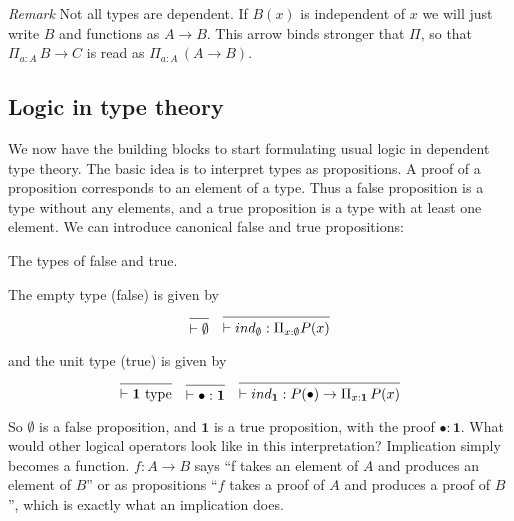 \documentclass[a4paper, 12pt]{article}
\newcommand{\type}{\text{ type}}
\theoremstyle{changedot}
\theoremstyle{changedotbreak}
\theoremstyle{nonumberplain}
\begin{document}
\textit{Remark} Not all types are dependent. If $B(x)$ is independent of $x$ we will just write $B$ and functions as $A \to B$. This arrow binds stronger that $\Pi$, so that $\Pi_{a:A}\, B \to C$ is read as $\Pi_{a:A}\, (A \to B)$.

\subsection{Logic in type theory}
We now have the building blocks to start formulating usual logic in dependent type theory. The basic idea is to interpret types as propositions. A proof of a proposition corresponds to an element of a type. Thus a false proposition is a type without any elements, and a true proposition is a type with at least one element. We can introduce canonical false and true propositions:

\begin{definition}
  The types of false and true.

  The empty type (false) is given by
\begin{align*}
  \begin{prooftree}
    \infer0{\vdash \emptyset}
  \end{prooftree} & &
  \begin{prooftree}
    \infer0{\vdash ind_{\emptyset} : \Pi_{x:\emptyset} P(x)}
  \end{prooftree}
\end{align*}

and the unit type (true) is given by
\begin{align*}
  \begin{prooftree}
    \infer0{\vdash \mathbf{1} \type}
  \end{prooftree} & &
                    \begin{prooftree}
                      \infer0{\vdash \bullet : \mathbf 1}
                      \end{prooftree}& &
                      \begin{prooftree}
                        \infer0{\vdash ind_{\mathbf 1} : P(\bullet) \to \Pi_{x : \mathbf 1}\, P(x)}
                      \end{prooftree}
  \end{align*}

\end{definition}

So $\emptyset$ is a false proposition, and $\mathbf 1$ is a true proposition, with the proof $\bullet : \mathbf 1$. What would other logical operators look like in this interpretation? Implication simply becomes a function. $f : A \to B$ says ``f takes an element of $A$ and produces an element of $B$'' or as propositions ``$f$ takes a proof of $A$ and produces a proof of $B$'', which is exactly what an implication does.
\end{document}
